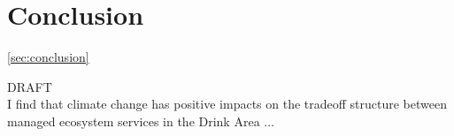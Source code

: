 \section{Conclusion}
\ref{sec:conclusion}

DRAFT\\
I find that climate change has positive impacts on the tradeoff structure between managed ecosystem services in the Drink Area $\ldots$